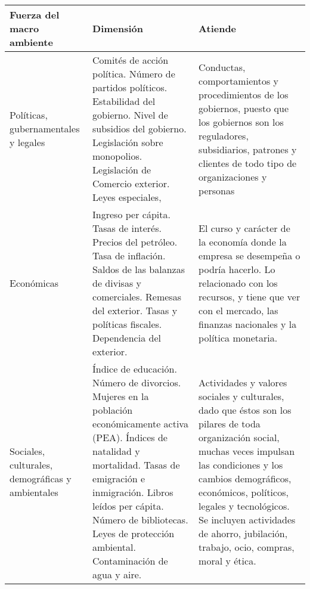 \begin{longtable}{|m{8em}|m{12em}|m{12em}|}
 \hline 
 Fuerza del macro ambiente & Dimensión & Atiende \\ 
 \hline 
 Políticas, gubernamentales y legales & Comités de acción política. \newline
 Número de partidos políticos. \newline
 Estabilidad del gobierno.\newline
 Nivel de subsidios del gobierno.\newline
 Legislación sobre monopolios.\newline
 Legislación de Comercio exterior.\newline
 Leyes especiales, & Conductas, comportamientos y procedimientos de los gobiernos, puesto que los gobiernos son los reguladores, subsidiarios, patrones y clientes de todo tipo de organizaciones y personas \\ 
 \hline 
 Económicas & Ingreso per cápita. \newline
	Tasas de interés.\newline
	Precios del petróleo.\newline
	Tasa de inflación.\newline
	Saldos de las balanzas de divisas y comerciales.\newline
	Remesas del exterior.\newline
	Tasas y políticas fiscales.\newline
	Dependencia del exterior. & El curso y carácter de la economía donde la empresa se desempeña o podría hacerlo. Lo relacionado con los recursos, y tiene que ver con el mercado, las finanzas nacionales y la política monetaria. \\ 
 \hline 
 Sociales, culturales, demográficas y ambientales & Índice de educación.\newline
Número de divorcios.\newline
Mujeres en la población económicamente activa (PEA).\newline
Índices de natalidad y mortalidad.\newline
Tasas de emigración e inmigración.\newline
Libros leídos per cápita.\newline
Número de bibliotecas.\newline
Leyes de protección ambiental.\newline
Contaminación de agua y aire. & Actividades y valores sociales y culturales, dado que éstos son los pilares de toda organización social, muchas veces impulsan las condiciones y los cambios demográficos, económicos, políticos, legales y tecnológicos. Se incluyen actividades de ahorro, jubilación, trabajo, ocio, compras, moral y ética. \\ 

\end{longtable}
